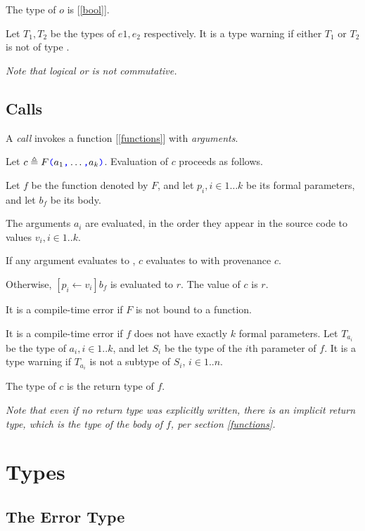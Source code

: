 \documentclass{article}
\begin{document}
{The type of $o$ is \BOOL{} [\ref{bool}].

Let $T_1, T_2$ be the types of $e1, e_2$ respectively.  It is a type warning if either $T_1$ or $T_2$ is not of type \BOOL{}.

{\em
Note that logical or is not commutative.
}

\subsection{\space Calls}
\label{calls}

A {\em call} invokes a function [\ref{functions}] with {\em arguments}.

\FunctionCall{}
\ArgumentList{}

Let $c \triangleq F\texttt{\color{blue} (}{}a_1\texttt{\color{blue} ,}{} \ldots\texttt{\color{blue} ,}{} a_k\texttt{\color{blue} )}$. Evaluation of $c$ proceeds as follows. 

Let $f$ be the function denoted by $F$, and let $p_i, i \in 1 \ldots k$ be its formal parameters, and let $b_f$ be its body.

The arguments $a_i$ are evaluated, in the order they appear in the source code to values $v_i , i \in 1..k$. 

If any argument evaluates to \NULL{}, $c$ evaluates to \NULL{} with provenance $c$. 

Otherwise, $[p_i \leftarrow v_i]b_f$ is evaluated to $r$. The value of $c$ is $r$.

It is a compile-time error if $F$ is not bound to a function. 

It is a compile-time error if $f$ does not have exactly $k$ formal parameters.
Let $T_{a_i}$ be the type of $a_i, i \in 1..k$, and let $S_i$ be the type of the $i$th parameter of $f$. It is a type warning if $T_{a_i}$ is not a subtype of $S_i$, $i \in 1..n$.

The type of $c$ is the  return type of $f$.

{\em Note that even if no return type was explicitly written, there is an implicit return type, which is the type of the body of $f$, per section \ref{functions}.}

\section{Types}
\label{types}


\subsection{The Error Type}
\label{theErrorType}

}
\end{document}
